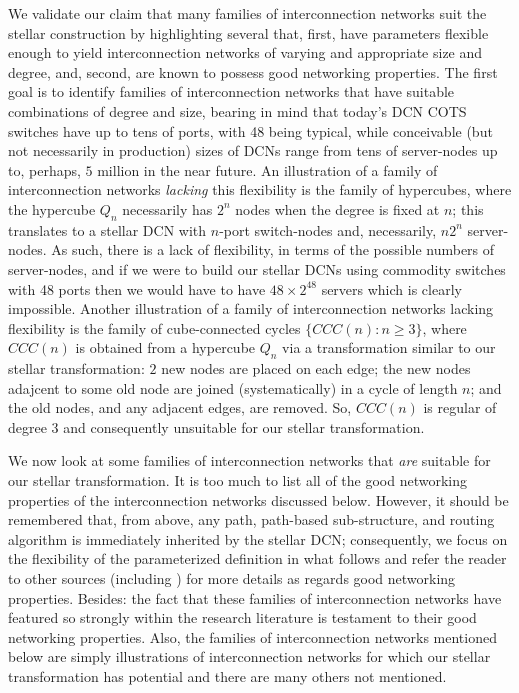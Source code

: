 \documentclass[]{amsart}
\begin{document}
We validate our claim that many families of interconnection networks suit the stellar construction by highlighting several that, first, have parameters flexible enough to yield interconnection networks of varying and appropriate size and degree, and, second, are known to possess good networking properties. The first goal is to identify families of interconnection networks that have suitable combinations of degree and size, bearing in mind that today's DCN COTS switches have up to tens of ports, with 48 being typical, while conceivable (but not necessarily in production) sizes of DCNs range from tens of server-nodes up to, perhaps, $5$ million in the near future. An illustration of a family of interconnection networks \emph{lacking\/} this flexibility is the family of hypercubes, where the hypercube $Q_n$ necessarily has $2^n$ nodes when the degree is fixed at $n$; this translates to a stellar DCN with $n$-port switch-nodes and, necessarily, $n2^n$ server-nodes. As such, there is a lack of flexibility, in terms of the possible numbers of server-nodes, and if we were to build our stellar DCNs using commodity switches with 48 ports then we would have to have $48\times 2^{48}$ servers which is clearly impossible. Another illustration of a family of interconnection networks lacking flexibility is the family of cube-connected cycles $\{CCC(n): n\geq 3\}$, where $CCC(n)$ is obtained from a hypercube $Q_n$ via a transformation similar to our stellar transformation: $2$ new nodes are placed on each edge; the new nodes adajcent to some old node are joined (systematically) in a cycle of length $n$; and the old nodes, and any adjacent edges, are removed. So, $CCC(n)$ is regular of degree $3$ and consequently unsuitable for our stellar transformation.

We now look at some families of interconnection networks that \emph{are\/} suitable for our stellar transformation. It is too much to list all of the good networking properties of the interconnection networks discussed below. However, it should be remembered that, from above, any path, path-based sub-structure, and routing algorithm is immediately inherited by the stellar DCN; consequently, we focus on the flexibility of the parameterized definition in what follows and refer the reader to other sources (including \cite{DallyTowles2003,HsuLin2009,Xu2010}) for more details as regards good networking properties. Besides: the fact that these families of interconnection networks have featured so strongly within the research literature is testament to their good networking properties. Also, the families of interconnection networks mentioned below are simply illustrations of interconnection networks for which our stellar transformation has potential and there are many others not mentioned.
\end{document}
